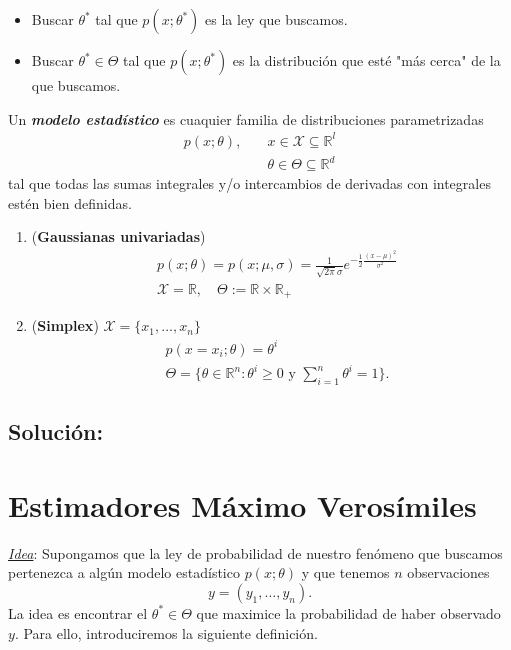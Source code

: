 \begin{itemize}
    \item Buscar $\theta^{*}$ tal que $p(x;\theta^*)$ es la ley que buscamos.
    \item Buscar $\theta^{*}\in\Theta$ tal que $p(x;\theta^*)$ es la distribuci\'on que est\'e "m\'as cerca" de la que buscamos.
\end{itemize}

\begin{definition}
Un \textit{\textbf{modelo estad\'istico}} es cuaquier familia de distribuciones parametrizadas 
\begin{align*}
    p(x;\theta),\quad&x\in\mathcal{X}\subseteq\mathbb{R}^l\\
    &\theta\in\Theta\subseteq\mathbb{R}^d
\end{align*}
tal que todas las sumas integrales y/o intercambios de derivadas con integrales est\'en bien definidas.
\end{definition}

\begin{example}
\begin{enumerate}[label=(\alph*)]
    \item (\textbf{Gaussianas univariadas})
    \begin{align*}
        &p(x;\theta)=p(x;\mu,\sigma)=\frac{1}{\sqrt{2\pi}\sigma}e^{-\frac{1}{2}\frac{(x-\mu)^2}{\sigma^2}}\\
        &\mathcal{X}=\mathbb{R},\quad\Theta:=\mathbb{R}\times\mathbb{R}_{+}
    \end{align*}
    \item (\textbf{Simplex}) $\mathcal{X}=\{x_1,\dots,x_n\}$
    \begin{align*}
        &p(x=x_i;\theta)=\theta^i\\
        &\Theta=\Bigg\{\theta\in\mathbb{R}^n\colon\theta^i\geq0\text{ y }\sum_{i=1}^{n}\theta^i=1\Bigg\}.
    \end{align*}
\end{enumerate}
\end{example}

\subsection*{Soluci\'on:}
\section{Estimadores M\'aximo Veros\'imiles}

\noindent\underline{\textit{Idea}}: Supongamos que la ley de probabilidad de nuestro fen\'omeno que buscamos pertenezca a alg\'un modelo estad\'istico $p(x;\theta)$ y que tenemos $n$ observaciones
\begin{equation*}
    y=(y_1,\dots,y_n).
\end{equation*}
La idea es encontrar el $\theta^{*}\in\Theta$ que maximice la probabilidad de haber observado $y$. Para ello, introduciremos la siguiente definici\'on.


